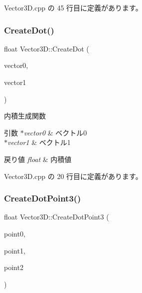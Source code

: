  Vector3\+D.\+cpp の 45 行目に定義があります。

\mbox{\label{class_vector3_d_ae4985d83fb38247a24ba42a82a3e7def}} 
\subsubsection{\texorpdfstring{Create\+Dot()}{CreateDot()}}
{\footnotesize\ttfamily float Vector3\+D\+::\+Create\+Dot (\begin{DoxyParamCaption}\item[{\mbox{\hyperlink{class_vector3_d}{Vector3D}} $\ast$}]{vector0,  }\item[{\mbox{\hyperlink{class_vector3_d}{Vector3D}} $\ast$}]{vector1 }\end{DoxyParamCaption})\hspace{0.3cm}{\ttfamily [static]}}



内積生成関数 


\begin{DoxyParams}{引数}
{\em $\ast$vector0} & ベクトル0 \\
\hline
{\em $\ast$vector1} & ベクトル1 \\
\hline
\end{DoxyParams}

\begin{DoxyRetVals}{戻り値}
{\em float} & 内積値 \\
\hline
\end{DoxyRetVals}


 Vector3\+D.\+cpp の 20 行目に定義があります。

\mbox{\label{class_vector3_d_ac83144257d920f85a5634b5087219b61}} 
\subsubsection{\texorpdfstring{Create\+Dot\+Point3()}{CreateDotPoint3()}}
{\footnotesize\ttfamily float Vector3\+D\+::\+Create\+Dot\+Point3 (\begin{DoxyParamCaption}\item[{\mbox{\hyperlink{class_vector3_d}{Vector3D}} $\ast$}]{point0,  }\item[{\mbox{\hyperlink{class_vector3_d}{Vector3D}} $\ast$}]{point1,  }\item[{\mbox{\hyperlink{class_vector3_d}{Vector3D}} $\ast$}]{point2 }\end{DoxyParamCaption})\hspace{0.3cm}{\ttfamily [static]}}



